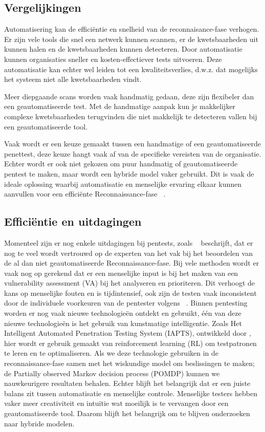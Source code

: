 \subsection{Vergelijkingen}

Automatisering kan de efficiëntie en snelheid van de reconnaisance-fase verhogen. Er zijn vele tools die snel een netwerk kunnen scannen, 
er de kwetsbaarheden uit kunnen halen en de kwetsbaarheden kunnen detecteren. Door automatisatie kunnen 
organisaties sneller en kosten-effectiever tests uitvoeren. Deze automatisatie kan echter wel leiden tot een kwaliteitsverlies, 
d.w.z. dat mogelijks het systeem niet alle kwetsbaarheden vindt. ~\autocite{peris}

Meer diepgaande scans worden vaak handmatig gedaan, deze zijn flexibeler dan een geautomatiseerde test. 
Met de handmatige aanpak kun je makkelijker complexe kwetsbaarheden terugvinden die niet makkelijk te detecteren vallen bij 
een geautomatiseerde tool.~\autocite{techtarget} 

Vaak wordt er een keuze gemaakt tussen een handmatige of een geautomatiseerde penettest, deze keuze hangt vaak af van de specifieke  
vereisten van de organisatie. Echter wordt er ook niet gekozen om puur handmatig of geautomatiseerde pentest te maken, maar wordt
een hybride model vaker gebruikt. Dit is vaak de ideale oplossing waarbij automatisatie en menselijke ervaring elkaar kunnen 
aanvullen voor een efficiënte Reconnaissance-fase ~\autocite{techtarget}.

\subsection{Efficiëntie en uitdagingen}

Momenteel zijn er nog enkele uitdagingen bij pentests, zoals ~\textcite{Fugkeaw} beschrijft, dat er nog te veel wordt
vertrouwd op de experten van het vak bij het beoordelen van de al dan niet geautomatiseerde Reconnaissance-fase.
Bij vele methoden wordt er vaak nog op gerekend dat er een menselijke input is bij het maken van een vulnerability assessment (VA)
bij het analyseren en prioriteren. Dit verhoogt de kans op menselijke fouten en is tijdintensief, ook zijn de testen vaak
inconsistent door de individuele voorkeuren van de pentester volgens ~\textcite{Ghanem}.
Binnen pentesting worden er nog vaak nieuwe technologieën ontdekt en gebruikt, één van deze nieuwe technologieën is het gebruik van
kunstmatige intelligentie. Zoals Het Intelligent Automated Penetration Testing System (IAPTS), ontwikkeld door \textcite{Ghanem},
hier wordt er gebruik gemaakt van reinforcement learning (RL) om testpatronen te leren en te optimaliseren. Als we deze technologie
gebruiken in de reconnaissance-fase samen met het wiskundige model om beslissingen te maken; de Partially observed Markov decision process (POMDP)
kunnen we nauwkeurigere resultaten behalen.
Echter blijft het belangrijk dat er een juiste balans zit tussen automatisatie en menselijke controle.  Menselijke testers hebben vaker
meer creativiteit en intuïtie wat moeilijk is te vervangen door een geautomatiseerde tool. Daarom blijft het belangrijk om te blijven onderzoeken 
naar hybride modelen.





